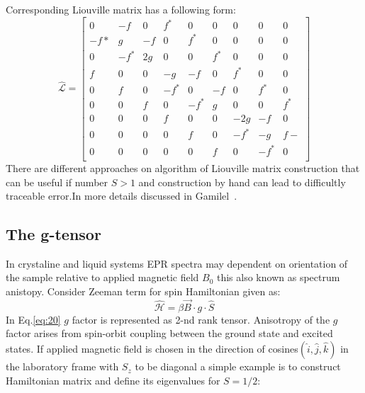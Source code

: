 Corresponding Liouville matrix has a following form: 
\begin{equation}\label{spinoneliv}
\hat{\mathcal{L}} = \begin{bmatrix}
       0 & -f & 0 & f^* &0 & 0 & 0 & 0 & 0         \\[0.3em]
       -f* & g  & -f   & 0 &f^* & 0  & 0   & 0 & 0         \\[0.3em]
       0 & -f^*  & 2g   & 0 &0 & f^*  & 0   & 0 & 0         \\[0.3em]
       f & 0  & 0   & -g &-f & 0  & f^*   & 0 & 0         \\[0.3em]
       0 & f  & 0   & -f^* &0 & -f  & 0   & f^* & 0         \\[0.3em]
       0 & 0  & f   & 0 &-f^* & g  & 0   & 0 & f^*         \\[0.3em]
       0 & 0  & 0   & f &0 & 0  & -2g   & -f & 0         \\[0.3em]
       0 & 0  & 0   & 0 &f & 0  & -f^*   & -g & f-         \\[0.3em]
       0 & 0  & 0   & 0 &0 & f  & 0   & -f^* & 0         \\[0.3em]
     \end{bmatrix}
\end{equation}
There are different approaches on algorithm of Liouville matrix construction that can be useful if number $S>1$ and construction by hand can lead to difficultly traceable error.In more details  discussed in Gamilel~\cite{gam}.   
\subsection{The g-tensor}
In crystaline and liquid systems EPR spectra may dependent on orientation of the sample relative to applied magnetic field $B_0$ this also known as spectrum anistopy. Consider Zeeman term for spin Hamiltonian given as: 
\begin{equation}\label{eq:20}
\mathcal{\hat{H}}=\beta \vec{B}\cdot g \cdot \hat{S}
\end{equation} 
In Eq.\ref{eq:20} $g$ factor is represented as 2-nd rank tensor. Anisotropy of the $g$ factor arises from spin-orbit coupling between the ground state and excited states. If applied magnetic field is chosen in the direction of cosines$(\hat{i},\hat{j},\hat{k})$ in the laboratory frame with $S_z$ to be diagonal a simple example is to construct Hamiltonian matrix and define its eigenvalues for $S=1/2$:

